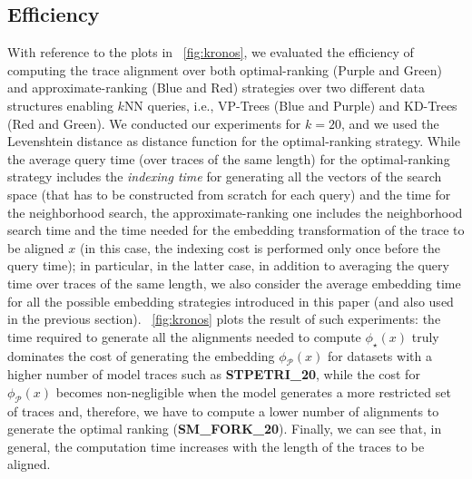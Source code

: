 \subsection{Efficiency}\label{subsec:efficio}
With reference to the plots in \figurename~\ref{fig:kronos}, we evaluated the efficiency of computing the trace alignment over both optimal-ranking ({\color{ggplotPurple}Purple} and {\color{ggplotGreen}Green}) and approximate-ranking ({\color{ggplotBlue}Blue} and {\color{ggplotRed}Red}) strategies over two different data structures enabling $k$NN queries, i.e., VP-Trees ({\color{ggplotBlue}Blue} and {\color{ggplotPurple}Purple}) and KD-Trees ({\color{ggplotRed}Red} and {\color{ggplotGreen}Green}). We conducted our experiments for $k=20$, and we used the Levenshtein distance as distance function for the optimal-ranking strategy. While the average query time (over traces of the same length) for the optimal-ranking strategy includes the \textit{indexing time} for generating all the vectors of the search space (that has to be constructed from scratch for each query) and the time for the neighborhood search, the approximate-ranking one includes the neighborhood search time and the time needed for the embedding transformation of the trace to be aligned $x$ (in this case, the indexing cost is performed only once before the query time); in particular, in the latter case, in addition to averaging the query time over traces of the same length, we also consider the average embedding time for all the possible embedding strategies introduced in this paper (and also used in the previous section). \figurename~\ref{fig:kronos} plots the result of such experiments: the time required to generate all the alignments needed to compute $\phi_\star(x)$ truly dominates the cost of generating the embedding $\phi_{\mathcal{P}}(x)$ for datasets with a higher number of model traces such as \textbf{STPETRI\_20}, while the cost for $\phi_{\mathcal{P}}(x)$ becomes non-negligible when the model generates a more restricted set of traces and, therefore, we have to compute a lower number of alignments to generate the optimal ranking (\textbf{SM\_FORK\_20}). Finally, we can see that, in general, the computation time increases with the length of the traces to be aligned.
